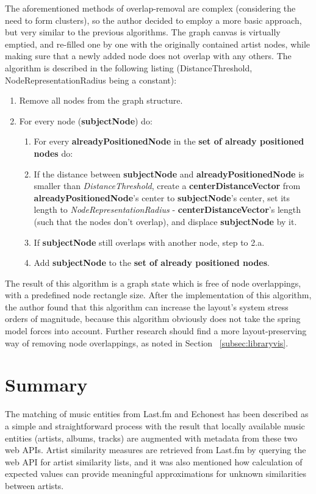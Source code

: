 The aforementioned methods of overlap-removal are complex (considering the need to form clusters), so the author decided to employ a more basic approach, but very similar to the previous algorithms. The graph canvas is virtually emptied, and re-filled one by one with the originally contained artist nodes, while making sure that a newly added node does not overlap with any others. The algorithm is described in the following listing (DistanceThreshold, NodeRepresentationRadius being a constant):

\begin{enumerate}
\item Remove all nodes from the graph structure.	
\item For every node (\textbf{subjectNode}) do:
	\begin{enumerate}
		\item For every \textbf{alreadyPositionedNode} in the \textbf{set of already positioned nodes} do:
		\item If the distance between \textbf{subjectNode} and \textbf{alreadyPositionedNode} is smaller than \emph{DistanceThreshold}, create a \textbf{centerDistanceVector} from \textbf{alreadyPositionedNode}'s center to \textbf{subjectNode}'s center, set
		its length to \emph{NodeRepresentationRadius} - \textbf{centerDistanceVector}'s length (such that the nodes don't overlap), and displace \textbf{subjectNode} by it.
		\item If \textbf{subjectNode} still overlaps with another node, step to 2.a.
		\item Add \textbf{subjectNode} to the \textbf{set of already positioned nodes}.
	\end{enumerate}
\end{enumerate}

The result of this algorithm is a graph state which is free of node overlappings, with a predefined node rectangle size. After the implementation of this algorithm, the author found that this algorithm can increase the layout's system stress orders of magnitude, because this algorithm obviously does not take the spring model forces into account. Further research should find a more layout-preserving way of removing node overlappings, as noted in Section ~\ref{subsec:libraryvis}.

\section{Summary}

The matching of music entities from Last.fm and Echonest has been described as a simple and straightforward process with the result that locally available music entities (artists, albums, tracks) are augmented with metadata from these two web APIs. Artist similarity measures are retrieved from Last.fm by querying the web API for artist similarity lists, and it was also mentioned how calculation of expected values can provide meaningful approximations for unknown similarities between artists.

